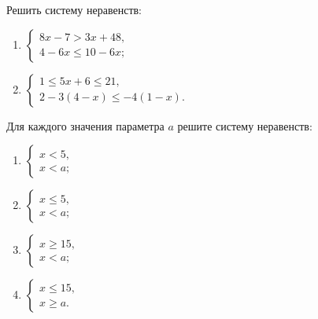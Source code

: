 \documentclass[algebra,a5paper]{pum}
\begin{document}
\begin{exercises}
  \begin{question}
    Решить систему неравенств:
    \begin{multicols}{2}
      \begin{enumerate}[label=\arabic*),nosep]

        \item $\begin{cases} 8x-7>3x+48,\\ 4-6x\le10-6x; \end{cases}$
        \item $\begin{cases} 1\le5x+6\le21,\\ 2-3(4-x)\le -4(1-x). \end{cases}$
      \end{enumerate}
    \end{multicols}
  \end{question}
  \begin{question}
    Для каждого значения параметра $a$ решите систему неравенств:
    \begin{multicols}{2}
      \begin{enumerate}[label=\arabic*),nosep]

        \item $\begin{cases} x<5,\\ x<a; \end{cases}$
        \item $\begin{cases} x\le5,\\ x<a; \end{cases}$
        \item $\begin{cases} x\ge15,\\ x<a; \end{cases}$
        \item $\begin{cases} x\le15,\\ x\ge a. \end{cases}$
      \end{enumerate}
    \end{multicols}
  \end{question}
\end{exercises}
\end{document}
